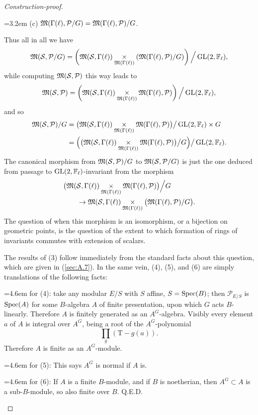 \begin{proof}[Construction-proof]
\begin{kmindent}
\noindent\hangindent=3.2em (c) $\mathfrak{M}(\Gamma(\ell), \mathcal{P}/G) = \mathfrak{M}(\Gamma(\ell), \mathcal{P})/G$.
\end{kmindent}
Thus all in all we have
\[
\mathfrak{M}(\mathcal{S}, \mathcal{P}/G) = \left( \mathfrak{M}(\mathcal{S}, \Gamma(\ell)) \underset{\mathfrak{M}(\Gamma(\ell))}{\times} \left( \mathfrak{M}(\Gamma(\ell), \mathcal{P})/G \right) \right) \Big/ \operatorname{GL}(2,\mathbb{F}_\ell) ,
\]
while computing $\mathfrak{M}(\mathcal{S}, \mathcal{P})$ this way leads to
\[
\mathfrak{M}(\mathcal{S}, \mathcal{P}) = \left( \mathfrak{M}(\mathcal{S}, \Gamma(\ell)) \underset{\mathfrak{M}(\Gamma(\ell))}{\times} \mathfrak{M}(\Gamma(\ell), \mathcal{P}) \right) \Big/ \operatorname{GL}(2,\mathbb{F}_\ell) ,
\]
and so
\[
\begin{aligned}
\mathfrak{M}(\mathcal{S}, \mathcal{P})/G
  &= \bigl( \mathfrak{M}(\mathcal{S}, \Gamma(\ell)) \underset{\mathfrak{M}(\Gamma(\ell))}{\times} \mathfrak{M}(\Gamma(\ell), \mathcal{P}) \bigr) \big/ \operatorname{GL}(2,\mathbb{F}_\ell) \times G \\
  &= \Bigl( \bigl( \mathfrak{M}(\mathcal{S}, \Gamma(\ell)) \underset{\mathfrak{M}(\Gamma(\ell))}{\times} \mathfrak{M}(\Gamma(\ell), \mathcal{P}) \bigr) \big/ G \Bigr) \big/ \operatorname{GL}(2,\mathbb{F}_\ell) .
\end{aligned}
\]
The canonical morphism from $\mathfrak{M}(\mathcal{S}, \mathcal{P})/G$ to $\mathfrak{M}(\mathcal{S}, \mathcal{P}/G)$ is just the one deduced from passage to $\operatorname{GL}(2,\mathbb{F}_\ell)$-invariant from the morphism
\[
\begin{aligned}
&\bigl( \mathfrak{M}(\mathcal{S}, \Gamma(\ell)) \underset{\mathfrak{M}(\Gamma(\ell))}{\times} \mathfrak{M}(\Gamma(\ell), \mathcal{P}) \bigr) \Big/ G \\
&\qquad \to \mathfrak{M}(\mathcal{S}, \Gamma(\ell)) \underset{\mathfrak{M}(\Gamma(\ell))}{\times} \bigl( \mathfrak{M}(\Gamma(\ell), \mathcal{P})/G \bigr) .
\end{aligned}
\]
The question of when this morphism is an isomorphism, or a bijection on geometric points, is the question of the extent to which formation of rings of invariants commutes with extension of scalars.

The results of (3) follow immediately from the standard facts about this question, which are given in (\ref{sec:A.7}). In the same vein, (4), (5), and (6) are simply translations of the following facts:
\begin{kmindent}
\noindent\hangindent=4.6em for (4): take any modular $E/S$ with $S$ affine, $S = \operatorname{Spec}(B)$; then $\mathcal{P}_{E/S}$ is $\operatorname{Spec}(A)$ for some $B$-algebra $A$ of finite presentation, upon which $G$ acts $B$-linearly. Therefore $A$ is finitely generated as an $A^G$-algebra. Visibly every element $a$ of $A$ is integral over $A^G$, being a root of the $A^G$-polynomial
\[
\prod_{g} (\mathrm{T} - g(a)) .
\]
Therefore $A$ is finite as an $A^G$-module.

\noindent\hangindent=4.6em for (5): This says $A^G$ is normal if $A$ is.

\noindent\hangindent=4.6em for (6): If $A$ is a finite $B$-module, and if $B$ is noetherian, then $A^G \subset A$ is a sub-$B$-module, so also finite over $B$. Q.E.D.
\end{kmindent}
\end{proof}

